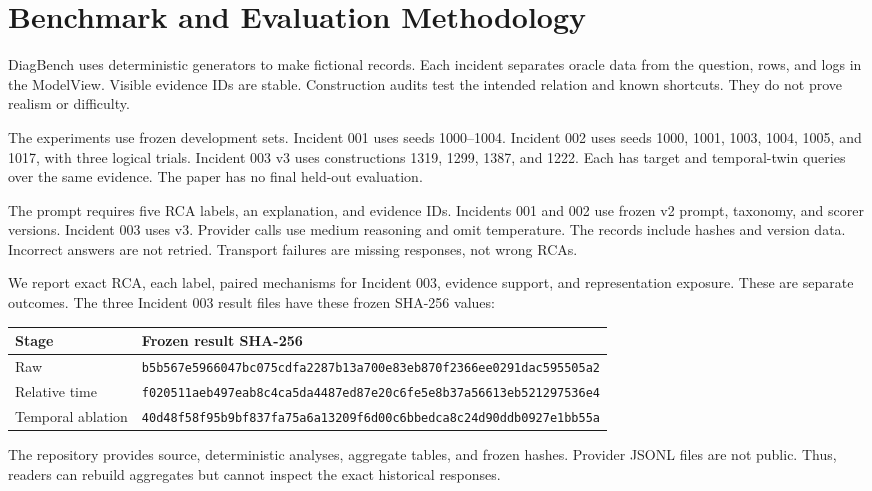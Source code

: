 \section{Benchmark and Evaluation Methodology}
\label{sec:method}
DiagBench uses deterministic generators to make fictional records. Each
incident separates oracle data from the question, rows, and logs in the
ModelView. Visible evidence IDs are stable. Construction audits test the
intended relation and known shortcuts. They do not prove realism or
difficulty.

The experiments use frozen development sets. Incident 001 uses seeds
1000--1004. Incident 002 uses seeds 1000, 1001, 1003, 1004, 1005, and 1017,
with three logical trials. Incident 003 v3 uses constructions 1319, 1299,
1387, and 1222. Each has target and temporal-twin queries over the same
evidence. The paper has no final held-out evaluation.

The prompt requires five RCA labels, an explanation, and evidence IDs.
Incidents 001 and 002 use frozen v2 prompt, taxonomy, and scorer versions.
Incident 003 uses v3. Provider calls use medium reasoning and omit
temperature. The records include hashes and version data. Incorrect answers
are not retried. Transport failures are missing responses, not wrong RCAs.

We report exact RCA, each label, paired mechanisms for Incident 003, evidence
support, and representation exposure. These are separate outcomes. The three
Incident 003 result files have these frozen SHA-256 values:
\begin{center}
\scriptsize
\begin{tabular}{ll}
\toprule
Stage & Frozen result SHA-256 \\
\midrule
Raw & \texttt{b5b567e5966047bc075cdfa2287b13a700e83eb870f2366ee0291dac595505a2} \\
Relative time & \texttt{f020511aeb497eab8c4ca5da4487ed87e20c6fe5e8b37a56613eb521297536e4} \\
Temporal ablation & \texttt{40d48f58f95b9bf837fa75a6a13209f6d00c6bbedca8c24d90ddb0927e1bb55a} \\
\bottomrule
\end{tabular}
\end{center}
The repository provides source, deterministic analyses, aggregate tables,
and frozen hashes. Provider JSONL files are not public. Thus, readers can
rebuild aggregates but cannot inspect the exact historical responses.

